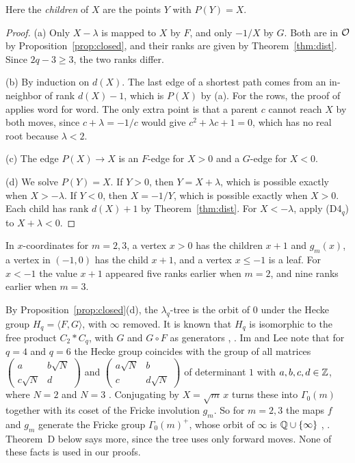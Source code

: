 Here the \emph{children} of $X$ are the points $Y$ with $P(Y)=X$.

\begin{proof}
(a) Only $X-\lambda$ is mapped to $X$ by $F$, and only $-1/X$ by $G$. Both are in $\mathcal{O}$ by
Proposition~\ref{prop:closed}, and their ranks are given by Theorem~\ref{thm:dist}. Since
$2q-3\ge3$, the two ranks differ.

(b) By induction on $d(X)$. The last edge of a shortest path comes from an in-neighbor of rank
$d(X)-1$, which is $P(X)$ by (a). For the rows, the proof of \cite[Corollary~3.8(a)]{P137} applies
word for word. The only extra point is that a parent $c$ cannot reach $X$ by both moves, since
$c+\lambda=-1/c$ would give $c^2+\lambda c+1=0$, which has no real root because $\lambda<2$.

(c) The edge $P(X)\to X$ is an $F$-edge for $X>0$ and a $G$-edge for $X<0$.

(d) We solve $P(Y)=X$. If $Y>0$, then $Y=X+\lambda$, which is possible exactly when $X>-\lambda$. If
$Y<0$, then $X=-1/Y$, which is possible exactly when $X>0$. Each child has rank $d(X)+1$ by
Theorem~\ref{thm:dist}. For $X<-\lambda$, apply (D4$_q$) to $X+\lambda<0$.
\end{proof}

In $x$-coordinates for $m=2,3$, a vertex $x>0$ has the children $x+1$ and $g_m(x)$, a vertex in
$(-1,0)$ has the child $x+1$, and a vertex $x\le-1$ is a leaf. For $x<-1$ the value $x+1$ appeared five
ranks earlier when $m=2$, and nine ranks earlier when $m=3$.

\begin{remark}\label{rem:group}
By Proposition~\ref{prop:closed}(d), the $\lambda_q$-tree is the orbit of $0$ under the Hecke group
$H_q=\langle F,G\rangle$, with $\infty$ removed. It is known that $H_q$ is isomorphic to the free
product $C_2*C_q$, with $G$ and $G\circ F$ as generators \cite[p.~1]{short-walker}, \cite[p.~4]{winsor}.
Im and Lee note that for $q=4$ and $q=6$ the Hecke group coincides with the group of all
matrices $\left(\begin{smallmatrix}a&b\sqrt N\\c\sqrt N&d\end{smallmatrix}\right)$ and
$\left(\begin{smallmatrix}a\sqrt N&b\\c&d\sqrt N\end{smallmatrix}\right)$ of determinant $1$ with
$a,b,c,d\in\mathbb{Z}$, where $N=2$ and $N=3$ \cite[Section~2]{im-lee}. Conjugating by $X=\sqrt m\,x$ turns these into
$\Gamma_0(m)$ together with its coset of the Fricke involution $g_m$. So for $m=2,3$ the maps $f$ and $g_m$
generate the Fricke group $\Gamma_0(m)^+$, whose orbit of $\infty$ is $\mathbb{Q}\cup\{\infty\}$
\cite[Proposition~2]{fairchild-hanusa}, \cite[p.~4]{winsor}. Theorem~D below says more, since the tree
uses only forward moves. None of these facts is used in our proofs.
\end{remark}


